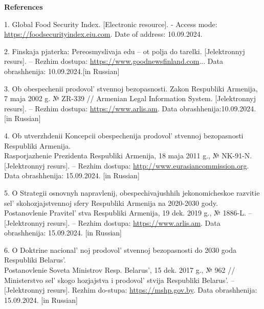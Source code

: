 \begin{center}
{\bfseries References}
\end{center}

\begin{references}
1. Global Food Security Index. {[}Electronic resource{]}. - Access mode:
\href{https://foodsecurityindex.eiu.com/Index}{https://foodsecurityindex.eiu.com}. Date of address: 10.09.2024.

2. Finskaja pjaterka: Pereosmyslivaja edu -- ot polja do tarelki.
{[}Jelektronnyj resurs{]}. -- Rezhim dostupa:
\href{https://www.goodnewsfinland.com/ru/feature/finskaya-pyaterka-pereosmyslivaya-edu-ot-polya-do-tarelki}{https://www.goodnewsfinland.com}...
Data obrashhenija: 10.09.2024.{[}in Russian{]}

3. Ob obespechenii prodovol' stvennoj bezopasnosti. Zakon
Respubliki Armenija, 7 maja 2002 g. № ZR-339 // Armenian Legal
Information System. {[}Jelektronnyj resurs{]}. -- Rezhim dostupa:
\href{https://www.arlis.am/DocumentView.aspx?docid=63049}{https://www.arlis.am}. Data
obrashhenija:10.09.2024.{[}in Russian{]}

4. Ob utverzhdenii Koncepcii obespechenija
prodovol' stvennoj bezopasnosti Respubliki Armenija.\\
Rasporjazhenie Prezidenta Respubliki Armenija, 18 maja 2011 g., №
NK-91-N. {[}Jelektronnyj resurs{]}. -- Rezhim dostupa:
\href{http://www.eurasiancommission.org/ru/act/prom\_i\_agroprom/dep\_agroprom/Pages/National-production-plans.aspx}{http://www.eurasiancommission.org}. Data obrashhenija: 15.09.2024. {[}in
Russian{]}

5. O Strategii osnovnyh napravlenij, obespechivajushhih jekonomicheskoe
razvitie sel' skohozjajstvennoj sfery Respubliki Armenija
na 2020-2030 gody. Postanovlenie Pravitel' stva
Respubliki Armenija, 19 dek. 2019 g., № 1886-L. -- {[}Jelektronnyj
resurs{]}. -- Rezhim dostupa: \href{https://www.arlis.am/DocumentView.aspx?DocID=137852}{https://www.arlis.am}. Data obrashhenija: 15.09.2024. {[}in
Russian{]}

6. O Doktrine nacional' noj
prodovol' stvennoj bezopasnosti do 2030 goda Respubliki
Belarus'. \\Postanovlenie Soveta Ministrov Resp.
Belarus', 15 dek. 2017 g., № 962 // Ministerstvo
sel' skogo hozjajstva i prodovol' stvija
Respubliki Belarus'. -- {[}Jelektronnyj resurs{]}. Rezhim
do-stupa: \href{https://mshp.gov.by/documents/plant/dccea377014340f4.html}{https://mshp.gov.by}.
Data obrashhenija: 15.09.2024. {[}in Russian{]}


\end{references}
